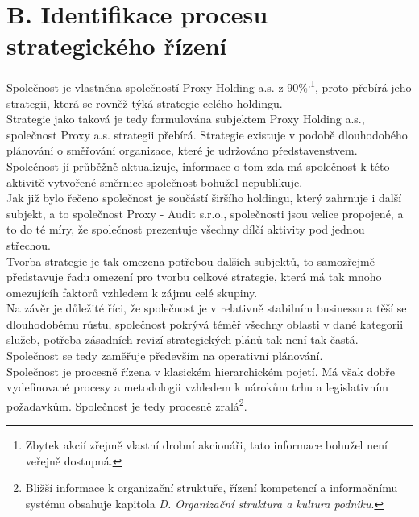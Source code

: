 \section*{B. Identifikace procesu strategického řízení}
\label{sec:Identifikace procesu strategickeho rizeni}

Společnost je vlastněna společností Proxy Holding a.s. z 90\%\textsuperscript{,}\footnote{Zbytek akcií zřejmě vlastní drobní akcionáři, tato informace bohužel není veřejně dostupná.}, proto přebírá jeho strategii, která se rovněž týká strategie celého holdingu.\\

Strategie jako taková je tedy formulována subjektem Proxy Holding a.s., společnost Proxy a.s. strategii přebírá. Strategie existuje v podobě dlouhodobého plánování o směřování organizace, které je udržováno představenstvem. Společnost jí průběžně aktualizuje, informace o tom zda má společnost k této aktivitě vytvořené směrnice společnost bohužel nepublikuje.\\

Jak již bylo řečeno společnost je součástí širšího holdingu, který zahrnuje i další subjekt, a to společnost Proxy - Audit s.r.o., společnosti jsou velice propojené, a to do té míry, že společnost prezentuje všechny dílčí aktivity pod jednou střechou.\\

Tvorba strategie je tak omezena potřebou dalších subjektů, to samozřejmě představuje řadu omezení pro tvorbu celkové strategie, která má tak mnoho omezujícíh faktorů vzhledem k zájmu celé skupiny.\\

Na závěr je důležité říci, že společnost je v relativně stabilním businessu a těší se dlouhodobému růstu, společnost pokrývá téměř všechny oblasti v dané kategorii služeb, potřeba zásadních revizí strategických plánů tak není tak častá. Společnost se tedy zaměřuje především na operativní plánování.\\

Společnost je procesně řízena v klasickém hierarchickém pojetí. Má však dobře vydefinované procesy a metodologii vzhledem k nárokům trhu a legislativním požadavkům. Společnost je tedy procesně zralá\footnote{Bližší informace k organizační struktuře, řízení kompetencí a informačnímu systému obsahuje kapitola \textit{D. Organizační struktura a kultura podniku}.}.\\

